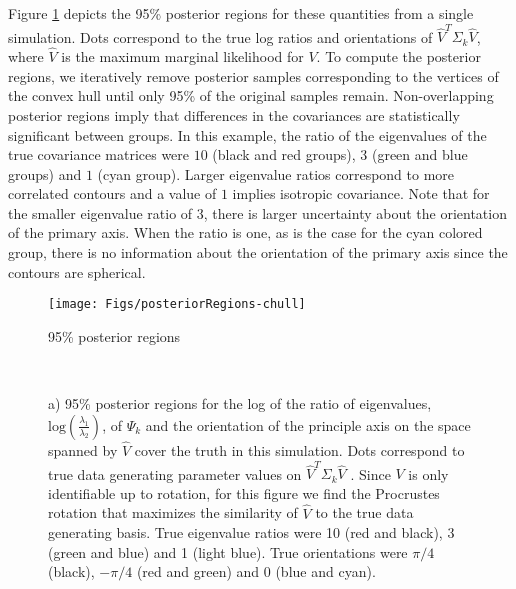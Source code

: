 \documentclass[12pt]{article}
\begin{document}
Figure \ref{fig:simPosterior} depicts the 95\% posterior regions for
these quantities from a single simulation.  Dots correspond to the
true log ratios and orientations of $\hat{V}^T\Sigma_k\hat{V}$, where
$\hat{V}$ is the maximum marginal likelihood for $V$. To compute
the posterior regions, we iteratively remove posterior samples corresponding to the
vertices of the convex hull until only 95\% of the original samples
remain.  Non-overlapping posterior regions imply that differences in
the covariances are statistically significant between groups.  In this
example, the ratio of the eigenvalues of the true covariance matrices
were $10$ (black and red groups), $3$ (green and blue groups) and $1$
(cyan group).  Larger eigenvalue ratios correspond to more
correlated contours and a value of $1$ implies isotropic covariance.
Note that for the smaller eigenvalue ratio of $3$, there is larger
uncertainty about the orientation of the primary axis.  When the ratio
is one, as is the case for the cyan colored group, there is no
information about the orientation of the primary axis since the contours
are spherical.

\begin{figure}[t]
    \centering
    \texttt{[image: Figs/posteriorRegions-chull]}
        \caption{95\% posterior regions}
        \label{fig:simPosterior}
    ~ %
    \caption{a) 95\% posterior regions for the log of the ratio of
      eigenvalues, $\text{log}(\frac{\lambda_1}{\lambda_2})$, of $\Psi_k$ and the
      orientation of the principle axis on the space spanned by $\hat{V}$
      cover the truth in this simulation.  Dots correspond to true data generating
      parameter values on $\hat{V}^T\Sigma_k\hat{V}$ .  Since $V$
      is only identifiable up to rotation, for this figure we find the Procrustes
      rotation that maximizes the similarity of $\hat{V}$ to the true
      data generating basis. True eigenvalue ratios were 10 (red and
      black), 3 (green and blue) and 1 (light blue).  True
      orientations were $\pi/4$ (black), $-\pi/4$ (red and green) and
      0 (blue and cyan). %
    }
\end{figure}
\end{document}
